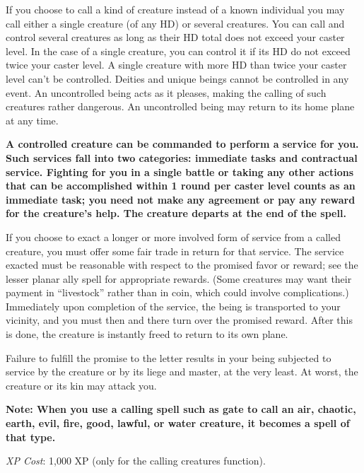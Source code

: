 {	If you choose to call a kind of creature instead of a known individual you may call either a single creature (of any HD) or several creatures. You can call and control several creatures as long as their HD total does not exceed your caster level. In the case of a single creature, you can control it if its HD do not exceed twice your caster level. A single creature with more HD than twice your caster level can't be controlled. Deities and unique beings cannot be controlled in any event. An uncontrolled being acts as it pleases, making the calling of such creatures rather dangerous. An uncontrolled being may return to its home plane at any time.

	\textbf{	A controlled creature can be commanded to perform a service for you. Such services fall into two categories: immediate tasks and contractual service. Fighting for you in a single battle or taking any other actions that can be accomplished within 1 round per caster level counts as an immediate task; you need not make any agreement or pay any reward for the creature's help. The creature departs at the end of the spell.}

	If you choose to exact a longer or more involved form of service from a called creature, you must offer some fair trade in return for that service. The service exacted must be reasonable with respect to the promised favor or reward; see the lesser planar ally spell for appropriate rewards. (Some creatures may want their payment in ``livestock'' rather than in coin, which could involve complications.) Immediately upon completion of the service, the being is transported to your vicinity, and you must then and there turn over the promised reward. After this is done, the creature is instantly freed to return to its own plane.

	Failure to fulfill the promise to the letter results in your being subjected to service by the creature or by its liege and master, at the very least. At worst, the creature or its kin may attack you.

	\textbf{Note: When you use a calling spell such as gate to call an air, chaotic, earth, evil, fire, good, lawful, or water creature, it becomes a spell of that type.}

	\textit{XP Cost}:
	1,000 XP (only for the calling creatures function).

}
